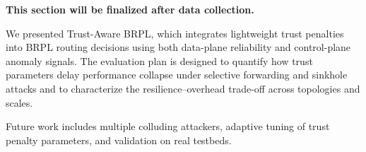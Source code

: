 \documentclass[11pt,a4paper]{article}
\begin{document}
\noindent\textbf{This section will be finalized after data collection.}

We presented Trust-Aware BRPL, which integrates lightweight trust penalties into BRPL routing decisions using both data-plane reliability and control-plane anomaly signals. The evaluation plan is designed to quantify how trust parameters delay performance collapse under selective forwarding and sinkhole attacks and to characterize the resilience–overhead trade-off across topologies and scales.

Future work includes multiple colluding attackers, adaptive tuning of trust penalty parameters, and validation on real testbeds.



\end{document}
